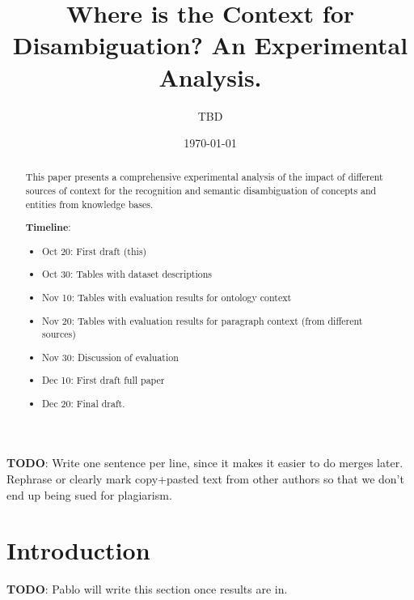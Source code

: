 \documentclass[10pt,a4paper]{article}
\title{Where is the Context for Disambiguation? An Experimental Analysis.}
\author{TBD}
\date{\today}
\newcommand{\todo}[1]{{\color{red}\textsf{\textbf{TODO}}: #1}}
\begin{document}
\maketitle

\begin{abstract}
This paper presents a comprehensive experimental analysis of the impact of different sources of context for the recognition and semantic disambiguation of concepts and entities from knowledge bases. 

\textbf{Timeline}:
\begin{itemize}
\item Oct 20: First draft (this)
\item Oct 30: Tables with dataset descriptions
\item Nov 10: Tables with evaluation results for ontology context
\item Nov 20: Tables with evaluation results for paragraph context (from different sources)
\item Nov 30: Discussion of evaluation
\item Dec 10: First draft full paper
\item Dec 20: Final draft.
\end{itemize}
\end{abstract}

\todo{Write one sentence per line, since it makes it easier to do merges later. Rephrase or clearly mark copy+pasted text from other authors so that we don't end up being sued for plagiarism.}

\section{Introduction}
\todo{Pablo will write this section once results are in.}
\end{document}
